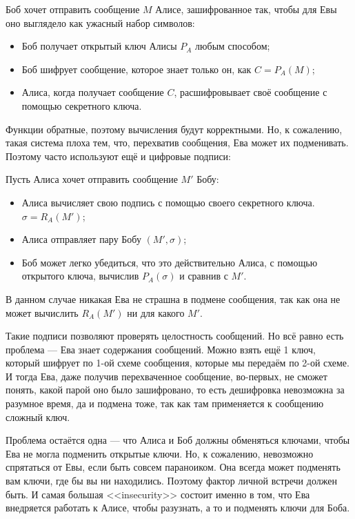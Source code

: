 \documentclass[a4paper, 12pt]{article}
\begin{document}
\begin{center}
  Боб хочет отправить сообщение $M$ Алисе, зашифрованное так, чтобы для Евы оно
  выглядело как ужасный набор символов:
  \begin{itemize}
    \item Боб получает открытый ключ Алисы $P_{A}$ любым способом;
    \item Боб шифрует сообщение, которое знает только он, как $C = P_{A}(M)$;
    \item Алиса, когда получает сообщение $C$, расшифровывает своё сообщение с
    помощью секретного ключа.
  \end{itemize}
\end{center}

Функции обратные, поэтому вычисления будут корректными. Но, к сожалению, такая 
система плоха тем, что, перехватив сообщения, Ева может их подменивать. Поэтому
часто используют ещё и цифровые подписи:

\begin{center}
Пусть Алиса хочет отправить сообщение $M'$ Бобу:
  \begin{itemize}
    \item Алиса вычисляет свою подпись с помощью своего секретного ключа.
    $\sigma = R_{A}(M')$;
    \item Алиса отправляет пару Бобу $(M', \sigma)$;
    \item Боб может легко убедиться, что это действительно Алиса, с помощью
    открытого ключа, вычислив $P_{A}(\sigma)$ и сравнив с $M'$.
  \end{itemize}
\end{center}

В данном случае никакая Ева не страшна в подмене сообщения, так как она не может
вычислить $R_{A}(M')$ ни для какого $M'$.

Такие подписи позволяют проверять целостность сообщений. Но всё равно есть
проблема --- Ева знает содержания сообщений. Можно взять ещё 1 ключ, который
шифрует по 1-ой схеме сообщения, которые мы передаём по 2-ой схеме. И тогда
Ева, даже получив перехваченное сообщение, во-первых, не сможет понять, какой
парой оно было зашифровано, то есть дешифровка невозможна за разумное время,
да и подмена тоже, так как там применяется к сообщению сложный ключ.

Проблема остаётся одна --- что Алиса и Боб должны обменяться ключами, чтобы
Ева не могла подменить открытые ключи. Но, к сожалению, невозможно спрятаться
от Евы, если быть совсем параноиком. Она всегда может подменять вам ключи, где
бы вы ни находились. Поэтому фактор личной встречи должен быть. И самая большая
<<insecurity>> состоит именно в том, что Ева внедряется работать к Алисе,
чтобы разузнать, а то и подменять ключи для Боба.
\end{document}
